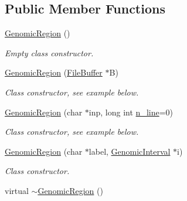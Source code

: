 \subsection*{Public Member Functions}
\begin{DoxyCompactItemize}
\item 
\hypertarget{classGenomicRegion_a8ff9fe5618b932a1caccbd9072ddaaef}{
\hyperlink{classGenomicRegion_a8ff9fe5618b932a1caccbd9072ddaaef}{GenomicRegion} ()}
\label{classGenomicRegion_a8ff9fe5618b932a1caccbd9072ddaaef}

\begin{DoxyCompactList}\small\item\em Empty class constructor. \end{DoxyCompactList}\item 
\hypertarget{classGenomicRegion_ac45e11c7c0d0477c4b8682ef5266d3d7}{
\hyperlink{classGenomicRegion_ac45e11c7c0d0477c4b8682ef5266d3d7}{GenomicRegion} (\hyperlink{classFileBuffer}{FileBuffer} $\ast$B)}
\label{classGenomicRegion_ac45e11c7c0d0477c4b8682ef5266d3d7}

\begin{DoxyCompactList}\small\item\em Class constructor, see example below. \end{DoxyCompactList}\item 
\hypertarget{classGenomicRegion_ac22559720502ea450aeb4f65c6c789e1}{
\hyperlink{classGenomicRegion_ac22559720502ea450aeb4f65c6c789e1}{GenomicRegion} (char $\ast$inp, long int \hyperlink{classGenomicRegion_aefe2255aeed5338060190ded05cb9c0c}{n\_\-line}=0)}
\label{classGenomicRegion_ac22559720502ea450aeb4f65c6c789e1}

\begin{DoxyCompactList}\small\item\em Class constructor, see example below. \end{DoxyCompactList}\item 
\hypertarget{classGenomicRegion_a6de3d0ff71615c36a7311509af56ae79}{
\hyperlink{classGenomicRegion_a6de3d0ff71615c36a7311509af56ae79}{GenomicRegion} (char $\ast$label, \hyperlink{classGenomicInterval}{GenomicInterval} $\ast$i)}
\label{classGenomicRegion_a6de3d0ff71615c36a7311509af56ae79}

\begin{DoxyCompactList}\small\item\em Class constructor. \end{DoxyCompactList}\item 
\hypertarget{classGenomicRegion_a37af413ecbed6ee0d36ecbc40d957947}{
virtual \hyperlink{classGenomicRegion_a37af413ecbed6ee0d36ecbc40d957947}{$\sim$GenomicRegion} ()}
\label{classGenomicRegion_a37af413ecbed6ee0d36ecbc40d957947}


\end{DoxyCompactItemize}
